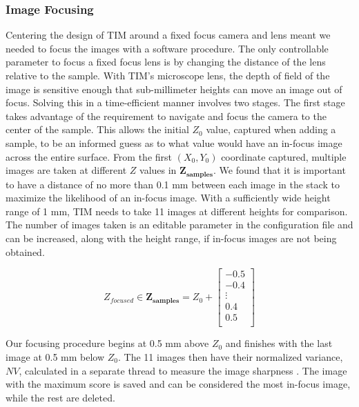 \documentclass[a4paper,12pt]{article}
\begin{document}
\subsubsection{Image Focusing}

Centering the design of TIM around a fixed focus camera and lens meant we needed to focus the images with a software procedure.
The only controllable parameter to focus a fixed focus lens is by changing the distance of the lens relative to the sample. 
With TIM's microscope lens, the depth of field of the image is sensitive enough that sub-millimeter heights can move an image out of focus.
Solving this in a time-efficient manner involves two stages. 
The first stage takes advantage of the requirement to navigate and focus the camera to the center of the sample.
This allows the initial $Z_0$ value, captured when adding a sample, to be an informed guess as to what value would have an in-focus image across the entire surface. 
From the first $(X_0, Y_0)$ coordinate captured, multiple images are taken at different $Z$ values in $\boldsymbol{Z_{\text{samples}}}$. %
We found that it is important to have a distance of no more than 0.1 mm between each image in the stack to maximize the likelihood of an in-focus image.
With a sufficiently wide height range of 1 mm, TIM needs to take  11 images at different heights for comparison. The number of images taken is an editable parameter in the configuration file and can be increased, along with the height range, if in-focus images are not being obtained.

\[
Z_{focused} \in
\boldsymbol{Z_{\text{samples}}} = 
Z_0 + 
\begin{bmatrix}
-0.5 \\
-0.4 \\
\vdots \\
0.4 \\
0.5 \\
\end{bmatrix}
\] %

Our focusing procedure begins at 0.5 mm above $Z_0$ and finishes with the last image at 0.5 mm below $Z_0$.
The 11 images then have their normalized variance, $NV$, calculated in a separate thread to measure the image sharpness \citep{sampat_extensive_2014}.
The image with the maximum score is saved and can be considered the most in-focus image, while the rest are deleted.
\end{document}
